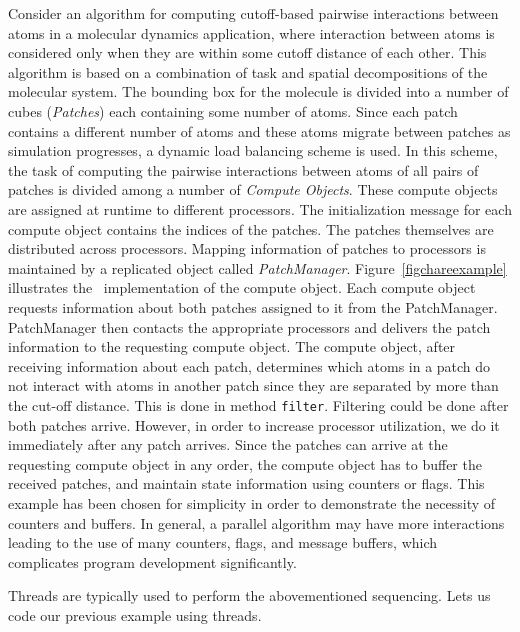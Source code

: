 Consider an algorithm for computing cutoff-based pairwise interactions
between atoms in a molecular dynamics application, where interaction
between atoms is considered only when they are within some cutoff
distance of each other.  This algorithm is based on a combination of
task and spatial decompositions of the molecular system. The bounding
box for the molecule is divided into a number of cubes ({\em Patches})
each containing some number of atoms.  Since each patch contains a
different number of atoms and these atoms migrate between patches as
simulation progresses, a dynamic load balancing scheme is used. In
this scheme, the task of computing the pairwise interactions between
atoms of all pairs of patches is divided among a number of {\em
Compute Objects}. These compute objects are assigned at runtime to
different processors. The initialization message for each compute
object contains the indices of the patches. The patches themselves are
distributed across processors. Mapping information of patches to
processors is maintained by a replicated object called {\em
PatchManager}.  Figure~\ref{figchareexample} illustrates the \charmpp\
implementation of the compute object. Each compute object requests
information about both patches assigned to it from the
PatchManager. PatchManager then contacts the appropriate processors
and delivers the patch information to the requesting compute
object. The compute object, after receiving information about each
patch, determines which atoms in a patch do not interact with atoms in
another patch since they are separated by more than the cut-off
distance. This is done in method {\tt filter}.  Filtering could be
done after both patches arrive. However, in order to increase
processor utilization, we do it immediately after any patch
arrives. Since the patches can arrive at the requesting compute object
in any order, the compute object has to buffer the received patches,
and maintain state information using counters or flags.  This example
has been chosen for simplicity in order to demonstrate the necessity
of counters and buffers.  In general, a parallel algorithm may have
more interactions leading to the use of many counters, flags, and
message buffers, which complicates program development significantly.

Threads are typically used to perform the abovementioned sequencing.
Lets us code our previous example using threads.

